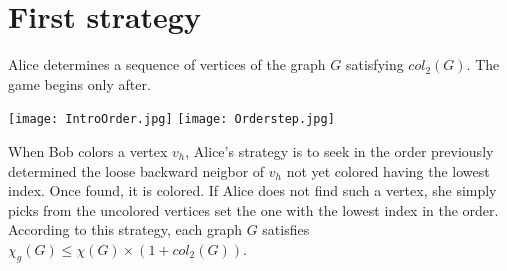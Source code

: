 \section{First strategy}

Alice determines a sequence of vertices of the graph $G$ satisfying $col_{2}(G)$. The game begins only after.

\texttt{[image: IntroOrder.jpg]}
\texttt{[image: Orderstep.jpg]}

When Bob colors a vertex $v_{h}$,
Alice's strategy is to seek in the order previously determined the loose backward neigbor of $v_{h}$ not yet
colored having the lowest index. Once found, it is colored. If Alice does not find such a vertex, she simply picks from the uncolored vertices set the one with the lowest index in the order.
According to this strategy, each graph $G$ satisfies $\chi_{g}(G) \leq \chi(G) \times (1 + col_{2}(G))$.